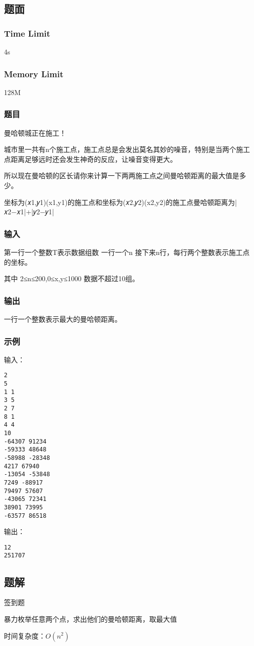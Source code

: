 \subsection{题面}

\subsubsection{Time Limit}
4s

\subsubsection{Memory Limit}
128M

\subsubsection{题目}
曼哈顿城正在施工！

城市里一共有n个施工点，施工点总是会发出莫名其妙的噪音，特别是当两个施工点距离足够远时还会发生神奇的反应，让噪音变得更大。

所以现在曼哈顿的区长请你来计算一下两两施工点之间曼哈顿距离的最大值是多少。

坐标为(𝑥1,𝑦1)(x1,y1)的施工点和坐标为(𝑥2,𝑦2)(x2,y2)的施工点曼哈顿距离为|𝑥2−𝑥1|+|𝑦2−𝑦1|

\subsubsection{输入}
第一行一个整数T表示数据组数
一行一个n
接下来n行，每行两个整数表示施工点的坐标。

其中 2≤n≤200,0≤x,y≤1000 数据不超过10组。

\subsubsection{输出}
一行一个整数表示最大的曼哈顿距离。

\subsubsection{示例}
输入：
\begin{lstlisting}
2
5
1 1
3 5
2 7
8 1
4 4
10
-64307 91234
-59333 48648
-58988 -28348
4217 67940
-13054 -53848
7249 -88917
79497 57607
-43065 72341
38901 73995
-63577 86518
\end{lstlisting}

输出：
\begin{lstlisting}
12
251707
\end{lstlisting}

\subsection{题解}

签到题

暴力枚举任意两个点，求出他们的曼哈顿距离，取最大值

时间复杂度：$O(n^2)$

